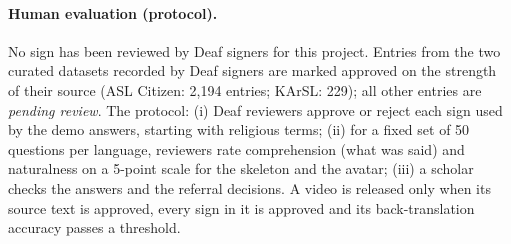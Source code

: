 \paragraph{Human evaluation (protocol).} No sign has been reviewed by Deaf signers for this project. Entries from the two
curated datasets recorded by Deaf signers are marked approved on the strength of their source (ASL Citizen: 2,194
entries; KArSL: 229); all other entries are \emph{pending review}. The protocol: (i) Deaf reviewers approve or reject
each sign used by the demo answers, starting with religious terms; (ii) for a fixed set of 50 questions per language,
reviewers rate comprehension (what was said) and naturalness on a 5-point scale for the skeleton and the avatar; (iii) a
scholar checks the answers and the referral decisions. A video is released only when its source text is approved, every
sign in it is approved and its back-translation accuracy passes a threshold.
